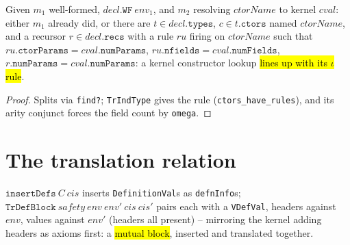 \begin{theorem}
\label{thm:add-induct-ctor-find}
\leanok
{}

 Given $m_1$ well-formed, $decl.\mathtt{WF}\ env_1$, and $m_2$ resolving
$ctorName$ to kernel $cval$: either $m_1$ already did, or there are
$t \in decl.\mathtt{types}$, $c \in t.\mathtt{ctors}$ named $ctorName$, and a recursor
$r \in decl.\mathtt{recs}$ with a rule $ru$ firing on $ctorName$ such that
$ru.\mathtt{ctorParams} = cval.\mathtt{numParams}$,
$ru.\mathtt{nfields} = cval.\mathtt{numFields}$, $r.\mathtt{numParams} =
cval.\mathtt{numParams}$: a kernel constructor lookup \hl{lines up with its $\iota$ rule}.
\end{theorem}
\begin{proof}
\leanok
{} Splits via \texttt{find?}; \texttt{TrIndType} gives the rule
(\texttt{ctors\_have\_rules}), and its arity conjunct forces the field count by
\texttt{omega}.
\end{proof}

\section{The translation relation}

\begin{definition}
\label{def:insert-defs}
\leanok
{}

 $\mathtt{insertDefs}\ C\ cis$ inserts \texttt{DefinitionVal}s as
\texttt{defnInfo}s; $\mathtt{TrDefBlock}\ safety\ env\ env'\ cis\ cis'$ pairs each with a
\texttt{VDefVal}, headers against $env$, values against $env'$ (headers all present) --
mirroring the kernel adding headers as axioms first: a \hl{mutual block}, inserted and
translated together.
\end{definition}


